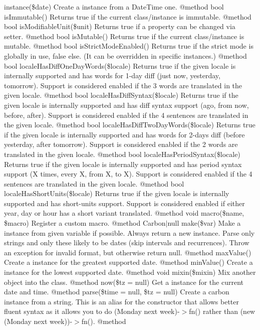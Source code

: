 \begin{DoxyRefList}
instance(\$date) Create a  instance from a Date\+Time one. @method bool is\+Immutable() Returns true if the current class/instance is immutable. @method bool is\+Modifiable\+Unit(\$unit) Returns true if a property can be changed via setter. @method bool is\+Mutable() Returns true if the current class/instance is mutable. @method bool is\+Strict\+Mode\+Enabled() Returns true if the strict mode is globally in use, false else. (It can be overridden in specific instances.) @method bool locale\+Has\+Diff\+One\+Day\+Words(\$locale) Returns true if the given locale is internally supported and has words for 1-\/day diff (just now, yesterday, tomorrow). Support is considered enabled if the 3 words are translated in the given locale. @method bool locale\+Has\+Diff\+Syntax(\$locale) Returns true if the given locale is internally supported and has diff syntax support (ago, from now, before, after). Support is considered enabled if the 4 sentences are translated in the given locale. @method bool locale\+Has\+Diff\+Two\+Day\+Words(\$locale) Returns true if the given locale is internally supported and has words for 2-\/days diff (before yesterday, after tomorrow). Support is considered enabled if the 2 words are translated in the given locale. @method bool locale\+Has\+Period\+Syntax(\$locale) Returns true if the given locale is internally supported and has period syntax support (X times, every X, from X, to X). Support is considered enabled if the 4 sentences are translated in the given locale. @method bool locale\+Has\+Short\+Units(\$locale) Returns true if the given locale is internally supported and has short-\/units support. Support is considered enabled if either year, day or hour has a short variant translated. @method void macro(\$name, \$macro) Register a custom macro. @method Carbon\texorpdfstring{$\vert$}{|}null make(\$var) Make a  instance from given variable if possible. Always return a new instance. Parse only strings and only these likely to be dates (skip intervals and recurrences). Throw an exception for invalid format, but otherwise return null. @method  max\+Value() Create a  instance for the greatest supported date. @method  min\+Value() Create a  instance for the lowest supported date. @method void mixin(\$mixin) Mix another object into the class. @method  now(\$tz = null) Get a  instance for the current date and time. @method  parse(\$time = null, \$tz = null) Create a carbon instance from a string. This is an alias for the constructor that allows better fluent syntax as it allows you to do (\textquotesingle{}Monday next week\textquotesingle{})-\/\texorpdfstring{$>$}{>}fn() rather than (new (\textquotesingle{}Monday next week\textquotesingle{}))-\/\texorpdfstring{$>$}{>}fn(). @method  
\end{DoxyRefList}
